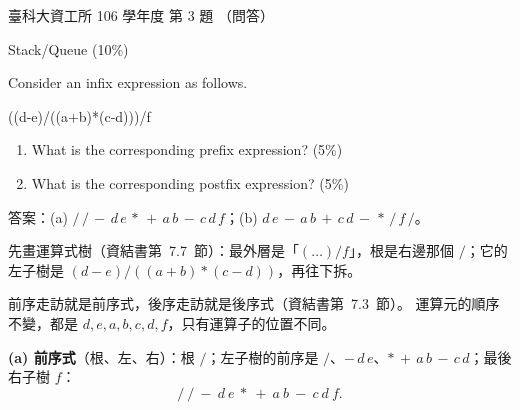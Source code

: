 \begin{pastexam}[label={px:ntust-106-ice-03}]{臺科大資工所 106 學年度 第 3 題}
（問答）

Stack/Queue (10\%)

Consider an infix expression as follows.

\hspace*{4em}((d-e)/((a+b)*(c-d)))/f
\begin{enumerate}[label=(\alph*)]
\item What is the corresponding prefix expression? (5\%)
\item What is the corresponding postfix expression? (5\%)
\end{enumerate}
\end{pastexam}

\begin{pastsoln}
答案：(a) ${/}\,{/}\,{-}\,d\,e\,{*}\,{+}\,a\,b\,{-}\,c\,d\,f$；(b) $d\,e\,{-}\,a\,b\,{+}\,c\,d\,{-}\,{*}\,{/}\,f\,{/}$。

先畫運算式樹（資結書第~7.7~節）：最外層是「$(\ldots)/f$」，根是右邊那個 $/$；它的左子樹是
$(d-e)/((a+b)*(c-d))$，再往下拆。
\begin{center}
\end{center}
前序走訪就是前序式，後序走訪就是後序式（資結書第~7.3~節）。 運算元的順序不變，都是
$d, e, a, b, c, d, f$，只有運算子的位置不同。

\textbf{(a) 前序式}（根、左、右）：根 $/$；左子樹的前序是 $/$、${-}\,d\,e$、${*}\,{+}\,a\,b\,{-}\,c\,d$；最後右子樹 $f$：
\[
{/}\ {/}\ {-}\ d\ e\ {*}\ {+}\ a\ b\ {-}\ c\ d\ f.
\]


\end{pastsoln}
